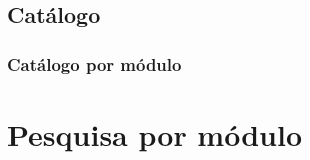 \documentclass[11pt,a4paper]{article}
\begin{document}





\begin{landscape}
\part{Catálogo}
\section{Catálogo por módulo}

\end{landscape}

\part{Pesquisa por módulo}






\end{document}
